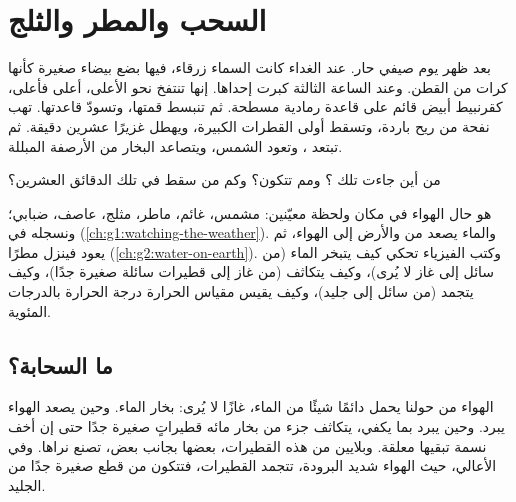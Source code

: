 \chapter{السحب والمطر والثلج}\label{ch:g4:clouds-rain-snow}

بعد ظهر يوم صيفي حار. عند الغداء كانت السماء زرقاء، فيها بضع  بيضاء
صغيرة كأنها كرات من القطن. وعند الساعة الثالثة كبرت إحداها. إنها تنتفخ
نحو الأعلى، أعلى فأعلى، كقرنبيط أبيض قائم على قاعدة رمادية مسطحة. ثم
تنبسط قمتها، وتسودّ قاعدتها. تهب نفحة من ريح باردة، وتسقط أولى القطرات
الكبيرة، ويهطل  غزيرًا عشرين دقيقة. ثم تبتعد ، وتعود الشمس،
ويتصاعد البخار من الأرصفة المبللة.

من أين جاءت تلك ؟ ومم تتكون؟ وكم من  سقط في تلك الدقائق
العشرين؟

\begin{recall}
 هو حال الهواء في مكان ولحظة معيّنين: مشمس، غائم، ماطر، مثلج، عاصف،
ضبابي؛ ونسجله في  (\cref{ch:g1:watching-the-weather}). والماء
يصعد من   والأرض إلى الهواء، ثم يعود فينزل مطرًا
(\cref{ch:g2:water-on-earth}). وكتب الفيزياء تحكي كيف يتبخر الماء (من
سائل إلى غاز لا يُرى)، وكيف يتكاثف (من غاز إلى قطيرات سائلة صغيرة جدًا)،
وكيف يتجمد (من سائل إلى جليد)، وكيف يقيس مقياس الحرارة درجة الحرارة
بالدرجات المئوية.
\end{recall}

\section{ما السحابة؟}

الهواء من حولنا يحمل دائمًا شيئًا من الماء، غازًا لا يُرى: بخار الماء.
وحين يصعد الهواء يبرد. وحين يبرد بما يكفي، يتكاثف جزء من بخار مائه قطيراتٍ
صغيرة جدًا حتى إن أخف نسمة تبقيها معلقة. وبلايين من هذه القطيرات، بعضها
بجانب بعض، تصنع  نراها. وفي الأعالي، حيث الهواء شديد البرودة، تتجمد
القطيرات، فتتكون  من قطع صغيرة جدًا من الجليد.

